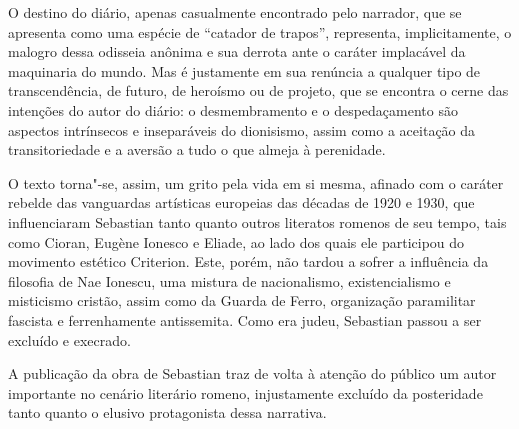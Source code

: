 O destino do diário, apenas casualmente encontrado pelo narrador, que se
apresenta como uma espécie de ``catador de trapos'', representa,
implicitamente, o malogro dessa odisseia anônima e sua derrota ante o
caráter implacável da maquinaria do mundo. Mas é justamente em sua
renúncia a qualquer tipo de transcendência, de futuro, de heroísmo ou de
projeto, que se encontra o cerne das intenções do autor do diário: o
desmembramento e o despedaçamento são aspectos intrínsecos e
inseparáveis do dionisismo, assim como a aceitação da transitoriedade e
a aversão a tudo o que almeja à perenidade.

O texto torna"-se, assim, um grito pela vida em si mesma, afinado com o
caráter rebelde das vanguardas artísticas europeias das décadas de 1920
e 1930, que influenciaram Sebastian tanto quanto outros literatos
romenos de seu tempo, tais como Cioran, Eugène Ionesco e Eliade, ao lado dos
quais ele participou do movimento estético Criterion. Este, porém, não
tardou a sofrer a influência da filosofia de Nae Ionescu, uma mistura de
nacionalismo, existencialismo e misticismo cristão, assim como da Guarda
de Ferro, organização paramilitar fascista e ferrenhamente antissemita.
Como era judeu, Sebastian passou a ser excluído e execrado.

A publicação da obra de Sebastian traz de volta à atenção do público um
autor importante no cenário literário romeno, injustamente excluído da
posteridade tanto quanto o elusivo protagonista dessa narrativa. \enlargethispage{\baselineskip}


\pagebreak
\blankpage
